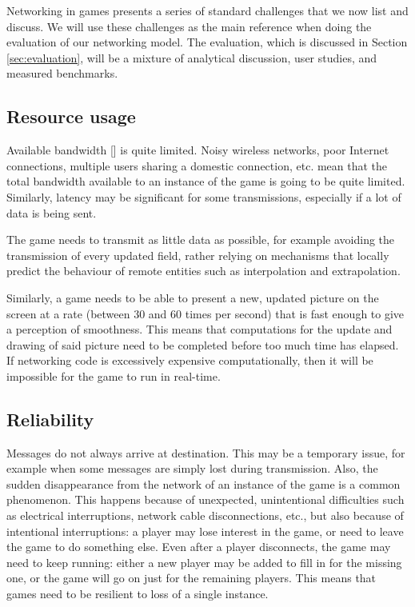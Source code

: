 Networking in games presents a series of standard challenges that we now list and discuss. We will use these challenges as the main reference when doing the evaluation of our networking model. The evaluation, which is discussed in Section \ref{sec:evaluation}, will be a mixture of analytical discussion, user studies, and measured benchmarks.

\subsection{Resource usage}
Available bandwidth [] is quite limited. Noisy wireless networks, poor Internet connections, multiple users sharing a domestic connection, etc. mean that the total bandwidth available to an instance of the game is going to be quite limited. Similarly, latency may be significant for some transmissions, especially if a lot of data is being sent.

The game needs to transmit as little data as possible, for example avoiding the transmission of every updated field, rather relying on mechanisms that locally predict the behaviour of remote entities such as interpolation and  extrapolation.

Similarly, a game needs to be able to present a new, updated picture on the screen at a rate (between 30 and 60 times per second) that is fast enough to give a perception of smoothness. This means that computations for the update and drawing of said picture need to be completed before too much time has elapsed. If networking code is excessively expensive computationally, then it will be impossible for the game to run in real-time.

\subsection{Reliability}
Messages do not always arrive at destination. This may be a temporary issue, for example when some messages are simply lost during transmission. Also, the sudden disappearance from the network of an instance of the game is a common phenomenon. This happens because of unexpected, unintentional difficulties such as electrical interruptions, network cable disconnections, etc., but also because of intentional interruptions: a player may lose interest in the game, or need to leave the game to do something else. Even after a player disconnects, the game may need to keep running: either a new player may be added to fill in for the missing one, or the game will go on just for the remaining players. This means that games need to be resilient to loss of a single instance.

